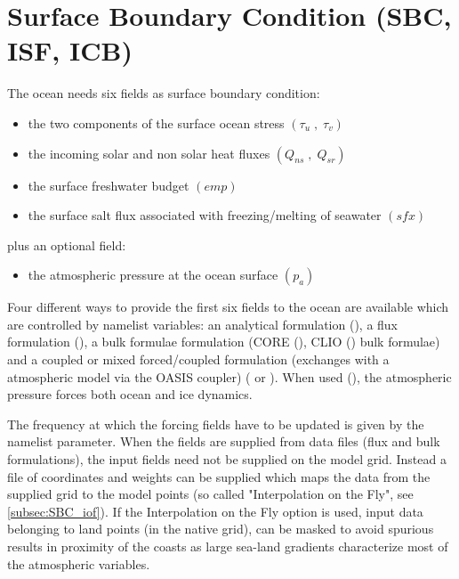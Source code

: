 \documentclass[../main/NEMO_manual]{subfiles}
\begin{document}
\chapter{Surface Boundary Condition (SBC, ISF, ICB) }
\label{chap:SBC}
\minitoc

\newpage



The ocean needs six fields as surface boundary condition:
\begin{itemize}
\item
  the two components of the surface ocean stress $\left( {\tau_u \;,\;\tau_v} \right)$
\item
  the incoming solar and non solar heat fluxes $\left( {Q_{ns} \;,\;Q_{sr} } \right)$
\item
  the surface freshwater budget $\left( {\textit{emp}} \right)$
\item
  the surface salt flux associated with freezing/melting of seawater $\left( {\textit{sfx}} \right)$
\end{itemize}
plus an optional field:
\begin{itemize}
	\item the atmospheric pressure at the ocean surface $\left( p_a \right)$
\end{itemize}

Four different ways to provide the first six fields to the ocean are available which are controlled by
namelist  variables:
an analytical formulation (),
a flux formulation (),
a bulk formulae formulation (CORE (),
CLIO () bulk formulae) and
a coupled or mixed forced/coupled formulation (exchanges with a atmospheric model via the OASIS coupler)
( or ). 
When used (\ie {}),
the atmospheric pressure forces both ocean and ice dynamics.

The frequency at which the forcing fields have to be updated is given by the  namelist parameter.
When the fields are supplied from data files (flux and bulk formulations),
the input fields need not be supplied on the model grid.
Instead a file of coordinates and weights can be supplied which maps the data from the supplied grid to
the model points (so called "Interpolation on the Fly", see \autoref{subsec:SBC_iof}).
If the Interpolation on the Fly option is used, input data belonging to land points (in the native grid),
can be masked to avoid spurious results in proximity of the coasts as
large sea-land gradients characterize most of the atmospheric variables.
\end{document}
